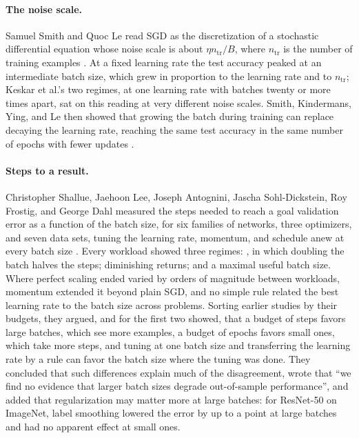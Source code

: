 \begin{refsection}
\paragraph{The noise scale.} Samuel Smith and Quoc Le read SGD as the discretization of a stochastic differential equation whose noise scale is about $\eta n_{\mathrm{tr}}/B$, where $n_{\mathrm{tr}}$ is the number of training examples \parencite{SmithLe2018}. At a fixed learning rate the test accuracy peaked at an intermediate batch size, which grew in proportion to the learning rate and to $n_{\mathrm{tr}}$; Keskar et al.'s two regimes, at one learning rate with batches twenty or more times apart, sat on this reading at very different noise scales. Smith, Kindermans, Ying, and Le then showed that growing the batch during training can replace decaying the learning rate, reaching the same test accuracy in the same number of epochs with fewer updates \parencite{SmithEtAl2018}.

\paragraph{Steps to a result.} Christopher Shallue, Jaehoon Lee, Joseph Antognini, Jascha Sohl-Dickstein, Roy Frostig, and George Dahl measured the steps needed to reach a goal validation error as a function of the batch size, for six families of networks, three optimizers, and seven data sets, tuning the learning rate, momentum, and schedule anew at every batch size \parencite{ShallueEtAl2019}. Every workload showed three regimes: , in which doubling the batch halves the steps; diminishing returns; and a maximal useful batch size. Where perfect scaling ended varied by orders of magnitude between workloads, momentum extended it beyond plain SGD, and no simple rule related the best learning rate to the batch size across problems. Sorting earlier studies by their budgets, they argued, and for the first two showed, that a budget of steps favors large batches, which see more examples, a budget of epochs favors small ones, which take more steps, and tuning at one batch size and transferring the learning rate by a rule can favor the batch size where the tuning was done. They concluded that such differences explain much of the disagreement, wrote that \enquote{we find no evidence that larger batch sizes degrade out-of-sample performance}, and added that regularization may matter more at large batches: for ResNet-50 on ImageNet, label smoothing lowered the error by up to a point at large batches and had no apparent effect at small ones.


\end{refsection}
